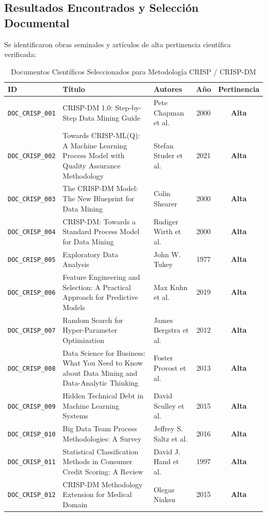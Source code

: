 \subsection{Resultados Encontrados y Selección Documental}
Se identificaron obras seminales y artículos de alta pertinencia científica verificada:
\begin{table}[H]
\centering
\scriptsize
\caption{Documentos Científicos Seleccionados para Metodología CRISP / CRISP-DM}
\begin{tabular}{p{1.8cm}p{4.5cm}p{3.2cm}cc}
\toprule
\textbf{ID} & \textbf{Título} & \textbf{Autores} & \textbf{Año} & \textbf{Pertinencia} \\
\midrule
\texttt{DOC_CRISP_001} & CRISP-DM 1.0: Step-by-Step Data Mining Guide & Pete Chapman et al. & 2000 & \textbf{Alta} \\
\texttt{DOC_CRISP_002} & Towards CRISP-ML(Q): A Machine Learning Process Model with Quality Assurance Methodology & Stefan Studer et al. & 2021 & \textbf{Alta} \\
\texttt{DOC_CRISP_003} & The CRISP-DM Model: The New Blueprint for Data Mining & Colin Shearer & 2000 & \textbf{Alta} \\
\texttt{DOC_CRISP_004} & CRISP-DM: Towards a Standard Process Model for Data Mining & Rudiger Wirth et al. & 2000 & \textbf{Alta} \\
\texttt{DOC_CRISP_005} & Exploratory Data Analysis & John W. Tukey & 1977 & \textbf{Alta} \\
\texttt{DOC_CRISP_006} & Feature Engineering and Selection: A Practical Approach for Predictive Models & Max Kuhn et al. & 2019 & \textbf{Alta} \\
\texttt{DOC_CRISP_007} & Random Search for Hyper-Parameter Optimization & James Bergstra et al. & 2012 & \textbf{Alta} \\
\texttt{DOC_CRISP_008} & Data Science for Business: What You Need to Know about Data Mining and Data-Analytic Thinking & Foster Provost et al. & 2013 & \textbf{Alta} \\
\texttt{DOC_CRISP_009} & Hidden Technical Debt in Machine Learning Systems & David Sculley et al. & 2015 & \textbf{Alta} \\
\texttt{DOC_CRISP_010} & Big Data Team Process Methodologies: A Survey & Jeffrey S. Saltz et al. & 2016 & \textbf{Alta} \\
\texttt{DOC_CRISP_011} & Statistical Classification Methods in Consumer Credit Scoring: A Review & David J. Hand et al. & 1997 & \textbf{Alta} \\
\texttt{DOC_CRISP_012} & CRISP-DM Methodology Extension for Medical Domain & Olegas Niaksu & 2015 & \textbf{Alta} \\

\end{tabular}
\end{table}
